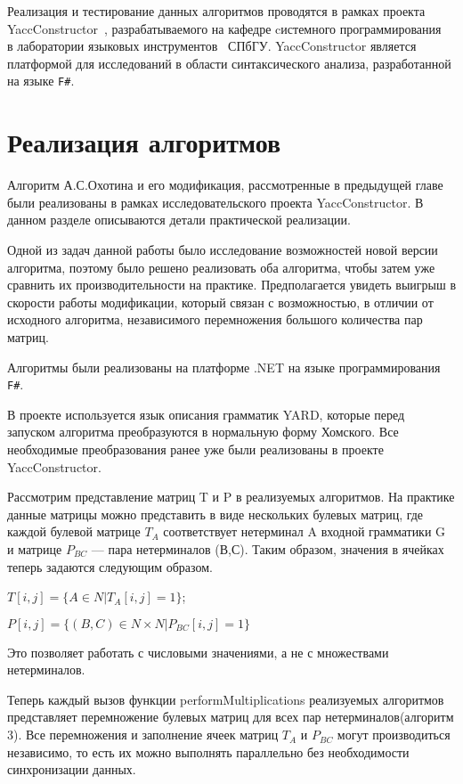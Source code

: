 \documentclass[14pt]{matmex-diploma}
\begin{document}
Реализация и тестирование данных алгоритмов проводятся в рамках проекта YaccConstructor~\cite{YC}, разрабатываемого на кафедре cистемного программирования~\cite{sp} в лаборатории языковых инструментов~\cite{jet} СПбГУ. YaccConstructor является платформой для исследований в области синтаксического анализа, разработанной на языке \texttt{F\#}. \newpage

\section{Реализация алгоритмов}
\BlankLine
Алгоритм А.С.Охотина и его модификация, рассмотренные в предыдущей главе были реализованы в рамках исследовательского проекта YaccConstructor. В данном разделе описываются детали практической реализации.

Одной из задач данной работы было исследование возможностей новой версии алгоритма, поэтому было решено реализовать оба алгоритма, чтобы затем уже сравнить их производительности на практике. Предполагается увидеть выигрыш в скорости работы модификации, который связан с возможностью, в отличии от исходного алгоритма,  независимого перемножения большого количества пар матриц.
\BlankLine

Алгоритмы были реализованы на платформе .NET на языке программирования \texttt{F\#}.

В проекте используется язык описания грамматик YARD, которые перед запуском алгоритма преобразуются в нормальную форму Хомского. Все необходимые преобразования ранее уже были реализованы в проекте YaccConstructor. 

Рассмотрим представление матриц T и P в реализуемых алгоритмов. На практике данные матрицы можно представить в виде нескольких булевых матриц, где каждой булевой матрице $T_A$ соответствует нетерминал A входной грамматики G и матрице  $P_{BC}$ --- пара нетерминалов (В,С). Таким образом, значения в ячейках теперь задаются следующим образом.

$T[i, j] = \{ A \in N | T_A[i, j] = 1\}$;

$P[i, j] = \{ (B,C) \in N\times N | P_{BC}[i, j] = 1\}$

Это позволяет работать с числовыми значениями, а не с множествами нетерминалов.

Теперь каждый вызов функции performMultiplications реализуемых алгоритмов представляет перемножение булевых матриц для всех пар нетерминалов(алгоритм 3). Все перемножения и заполнение ячеек матриц $T_A$ и $P_{BC}$ могут производиться независимо, то есть их можно выполнять параллельно без необходимости синхронизации данных.
\BlankLine
\end{document}
